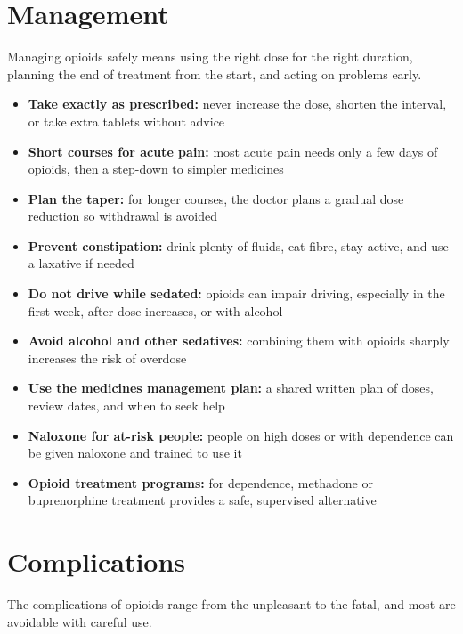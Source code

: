 \section*{Management}
Managing opioids safely means using the right dose for the right duration, planning the end of treatment from the start, and acting on problems early.

\begin{itemize}
    \item \textbf{Take exactly as prescribed:} never increase the dose, shorten the interval, or take extra tablets without advice
    \item \textbf{Short courses for acute pain:} most acute pain needs only a few days of opioids, then a step-down to simpler medicines
    \item \textbf{Plan the taper:} for longer courses, the doctor plans a gradual dose reduction so withdrawal is avoided
    \item \textbf{Prevent constipation:} drink plenty of fluids, eat fibre, stay active, and use a laxative if needed
    \item \textbf{Do not drive while sedated:} opioids can impair driving, especially in the first week, after dose increases, or with alcohol
    \item \textbf{Avoid alcohol and other sedatives:} combining them with opioids sharply increases the risk of overdose
    \item \textbf{Use the medicines management plan:} a shared written plan of doses, review dates, and when to seek help
    \item \textbf{Naloxone for at-risk people:} people on high doses or with dependence can be given naloxone and trained to use it
    \item \textbf{Opioid treatment programs:} for dependence, methadone or buprenorphine treatment provides a safe, supervised alternative
\end{itemize}

\section*{Complications}
The complications of opioids range from the unpleasant to the fatal, and most are avoidable with careful use.

